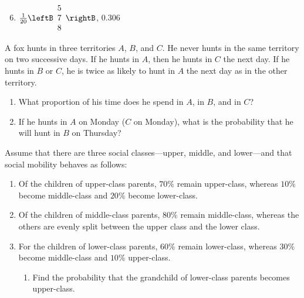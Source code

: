 \begin{multicols}{2}
\begin{ex}
\begin{sol}
\begin{enumerate}[label={\alph*.}]
\setcounter{enumi}{5}
\item $\frac{1}{20} \leftB \begin{array}{r}
5 \\
7 \\
8
\end{array} \rightB$, $0.306$

\end{enumerate}
\end{sol}
\end{ex}

\begin{ex}
A fox hunts in three territories $A$, $B$, and $C$. He never hunts in the same territory on two successive days. If he hunts in $A$, then he hunts in $C$ the next day. If he hunts in $B$ or $C$, he is twice as likely to hunt in $A$ the next day as in the other territory.


\begin{enumerate}[label={\alph*.}]
\item What proportion of his time does he spend in $A$, in $B$, and in $C$?

\item If he hunts in $A$ on Monday ($C$ on Monday), what is the probability that he will hunt in $B$ on Thursday?

\end{enumerate}
\end{ex}

\begin{ex}
Assume that there are three social classes---upper, middle, and lower---and that social mobility behaves as follows:


\begin{enumerate}
\item Of the children of upper-class parents, $70\%$ remain upper-class, whereas $10\%$ become middle-class and $20\%$ become lower-class.

\item Of the children of middle-class parents, $80\%$ remain middle-class, whereas the others are evenly split between the upper class and the lower class.

\item For the children of lower-class parents, $60\%$ remain lower-class, whereas $30\%$ become middle-class and $10\%$ upper-class.


\begin{enumerate}[label={\alph*.}]
\item Find the probability that the grandchild of lower-class parents becomes upper-class.


\end{enumerate}
\end{enumerate}
\end{ex}
\end{multicols}
